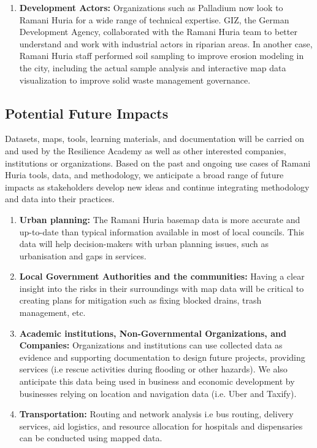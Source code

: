 \documentclass[a4paper,12pt,twoside]{article}
\begin{document}
\begin{enumerate}
\item \textbf{Development Actors:} Organizations such as Palladium now look to Ramani Huria for a wide range of technical expertise. GIZ, the German Development Agency, collaborated with the Ramani Huria team to better understand and work with industrial actors in riparian areas. In another case, Ramani Huria staff performed soil sampling to improve erosion modeling in the city, including the actual sample analysis and interactive map data visualization to improve solid waste management governance.   


\end{enumerate}

\subsection{Potential Future Impacts}

Datasets, maps, tools, learning materials, and documentation will be carried on and used by the Resilience Academy as well as other interested companies, institutions or organizations. Based on the past and ongoing use cases of Ramani Huria tools, data, and methodology, we anticipate a broad range of future impacts as stakeholders develop new ideas and continue integrating methodology and data into their practices. 

\begin{enumerate}
    
\item \textbf{Urban planning:} The Ramani Huria basemap data is more accurate and up-to-date than typical information available in most of local councils. This data will help decision-makers with urban planning issues, such as urbanisation and gaps in services.
\item \textbf{Local Government Authorities and the communities:} Having a clear insight into the risks in their surroundings with map data will be critical  to creating plans for mitigation such as fixing blocked drains, trash management, etc.
\item \textbf{Academic institutions, Non-Governmental Organizations, and Companies:} Organizations and institutions can use collected data as evidence and supporting documentation to design future projects, providing services (i.e rescue activities during flooding or other hazards). We also anticipate this data being used in business and economic development by businesses relying on location and navigation data (i.e. Uber and Taxify).
\item \textbf{Transportation:} Routing and network analysis i.e bus routing, delivery services, aid logistics, and resource allocation for hospitals and dispensaries can be conducted using mapped data.

\end{enumerate}
\end{document}
